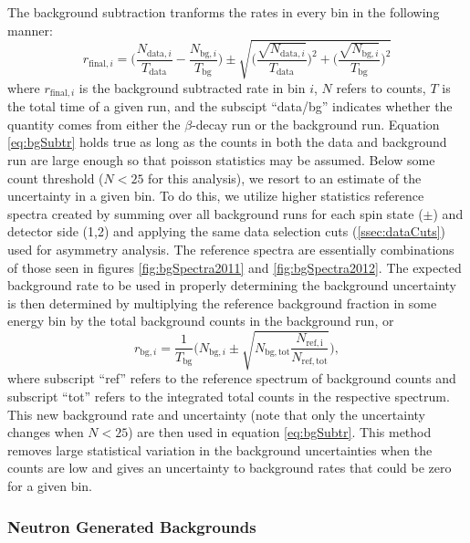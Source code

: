 The background subtraction tranforms the rates in every bin in the following manner:
%
\begin{equation} \label{eq:bgSubtr}
  r_{\mathrm{final},i} =  \Bigg( \frac{N_{\mathrm{data},i}}{T_{\mathrm{data}}}-\frac{N_{\mathrm{bg},i}}{T_{\mathrm{bg}}} \Bigg) \pm
  \sqrt{\bigg(\frac{\sqrt{N_{\mathrm{data},i}}}{T_{\mathrm{data}}}\bigg)^2+\bigg(\frac{\sqrt{N_{\mathrm{bg},i}}}{T_{\mathrm{bg}}}\bigg)^2}
\end{equation}
%
\noindent where $r_{\mathrm{final},i}$ is the background subtracted
rate in bin $i$, $N$ refers to counts, $T$ is the total time of
a given run, and the subscipt ``data/bg'' indicates whether the
quantity comes from either the $\beta$-decay run or the
background run. Equation \ref{eq:bgSubtr} holds true
as long as the counts in both the data and background run are large enough so that
poisson statistics may be assumed. Below some count threshold ($N<25$ for this analysis),
we resort to an estimate of the uncertainty in a given bin. To do this, we utilize
higher statistics reference spectra created by summing over all background runs for each
spin state ($\pm$) and detector side (1,2) and applying the same data selection cuts
(\ref{ssec:dataCuts}) used for asymmetry analysis. The reference spectra are essentially combinations
of those seen in figures \ref{fig:bgSpectra2011} and \ref{fig:bgSpectra2012}. The expected
background rate to be used in properly determining the background uncertainty
is then determined by multiplying the reference background fraction in some energy bin
by the total background counts in the background run, or
%
\begin{equation} \label{eq:bgRef}
  r_{\mathrm{bg},i} =  \frac{1}{T_{\mathrm{bg}}} \Bigg(N_{\mathrm{bg},i} \pm
  \sqrt{N_{\mathrm{bg,tot}} \frac{N_{\mathrm{ref,i}}}{N_{\mathrm{ref,tot}}} } \Bigg), 
\end{equation}
%
\noindent where subscript ``ref'' refers to the reference spectrum of background counts and
subscript ``tot'' refers to the integrated total counts in the respective spectrum. This new
background rate and uncertainty (note that only the uncertainty changes when $N<25$) are then
used in equation \ref{eq:bgSubtr}. This method
removes large statistical variation in the background uncertainties when the counts
are low and gives an uncertainty
to background rates that could be zero for a given bin. 

\subsubsection{Neutron Generated Backgrounds}

